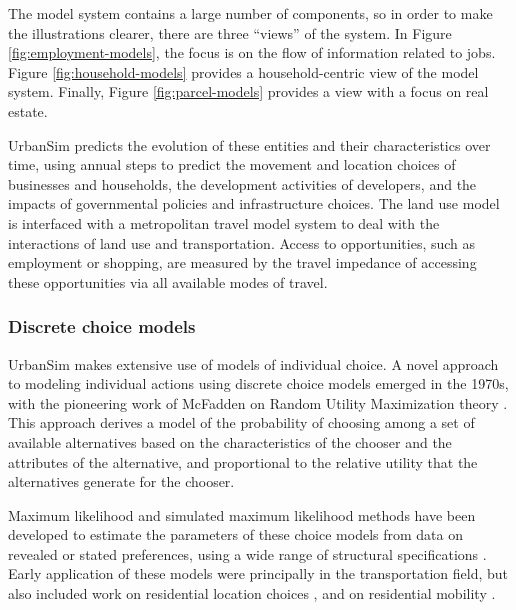 The model system contains a large number of components, so in order to make the illustrations clearer, there are three \enquote{views} of the system. In Figure \ref{fig:employment-models}, the focus is on the flow of information related to jobs. Figure \ref{fig:household-models} provides a household-centric view of the model system. Finally, Figure \ref{fig:parcel-models} provides a view with a focus on real estate.

UrbanSim predicts the evolution of these entities and their characteristics over time, using annual steps to predict the movement and location choices of businesses and households, the development activities of developers, and the impacts of governmental policies and infrastructure choices. The land use model is interfaced with a metropolitan travel model system to deal with the interactions of land use and transportation. Access to opportunities, such as employment or shopping, are measured by the travel impedance of accessing these opportunities via all available modes of travel.




\subsubsection{Discrete choice models}
\label{sec:discrete-choice}

UrbanSim makes extensive use of models of individual choice. A novel approach to modeling individual actions using discrete choice models emerged in the 1970s, with the pioneering work of McFadden on Random Utility Maximization theory
\citep{mcfadden-1974,mcfadden-1981}. This approach derives a model of the probability of choosing among a set of available alternatives based on the characteristics of the chooser and the attributes of the alternative, and proportional to the relative utility that the alternatives generate for the chooser.

Maximum likelihood and simulated maximum likelihood methods have been developed to estimate the parameters of these choice models from data on revealed or stated preferences, using a wide range of structural specifications \citep{train-book-2003}. Early application of these models were principally in the transportation field, but also included work on residential location choices \citep{quigley-eer-1976,lerman-trr-1977,mcfadden-1978}, and on residential mobility \citep{clark-vanlierop-1986}.

